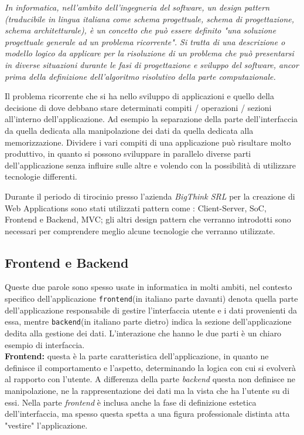 \emph{In informatica, nell'ambito dell'ingegneria del software, un design pattern (traducibile in lingua italiana come schema progettuale, schema di progettazione, schema architetturale), è un concetto che può essere definito "una soluzione progettuale generale ad un problema ricorrente". Si tratta di una descrizione o modello logico da applicare per la risoluzione di un problema che può presentarsi in diverse situazioni durante le fasi di progettazione e sviluppo del software, ancor prima della definizione dell'algoritmo risolutivo della parte computazionale.}
\hspace*{\fill}\cite{wiki:design_pattern} 

Il problema ricorrente che si ha nello sviluppo di applicazioni e quello della decisione di dove debbano stare determinati compiti / operazioni / sezioni all'interno dell'applicazione. Ad esempio la separazione della parte dell'interfaccia da quella dedicata alla manipolazione dei dati da quella dedicata alla memorizzazione. Dividere i vari compiti di una applicazione può risultare molto produttivo, in quanto si possono sviluppare in parallelo diverse parti dell'applicazione senza influire sulle altre e volendo con la possibilità di utilizzare tecnologie differenti.

Durante il periodo di tirocinio presso l'azienda \emph{BigThink SRL} per la creazione di Web Applications sono stati utilizzati pattern come : Client-Server, SoC, Frontend e Backend, MVC; gli altri design pattern che verranno introdotti sono necessari per comprendere meglio alcune tecnologie che verranno utilizzate.
 
\subsection{Frontend e Backend}
Queste due parole sono spesso usate in informatica in molti ambiti, nel contesto specifico dell'applicazione \texttt{frontend}(in italiano parte davanti) denota quella parte dell'applicazione responsabile di gestire l'interfaccia utente e i dati provenienti da essa, mentre \texttt{backend}(in italiano parte dietro) indica la sezione dell'applicazione dedita alla gestione dei dati. L'interazione che hanno le due parti è un chiaro esempio di interfaccia.\\

\textbf{Frontend:} questa è la parte caratteristica dell'applicazione, in quanto ne definisce il comportamento e l'aspetto, determinando la logica con cui si evolverà al rapporto con l'utente. A differenza della parte \emph{backend} questa non definisce ne manipolazione, ne la rappresentazione dei dati ma la vista che ha l'utente su di essi. Nella parte \emph{frontend} è inclusa anche la fase di definizione estetica dell'interfaccia, ma spesso questa spetta a una figura professionale distinta atta "vestire" l'applicazione.\\

